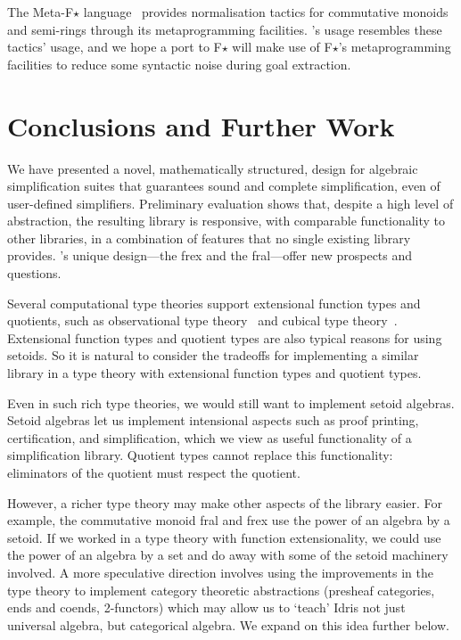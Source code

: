 The Meta-F$\star$ language~\cite{martinez-et-al:metafstar} provides
normalisation tactics for commutative monoids and semi-rings through
its metaprogramming facilities. \Frexlib{}'s usage resembles
these tactics' usage, and we hope a
\Frexlib{} port to F$\star$ will make use of F$\star$'s metaprogramming
facilities to reduce some syntactic noise during goal extraction.

\section{Conclusions and Further Work}

We have presented a novel, mathematically structured, design for
algebraic simplification suites that guarantees sound and complete
simplification, even of user-defined simplifiers. Preliminary
evaluation shows that, despite a high level of abstraction, the
resulting library is responsive, with comparable functionality
to other libraries, in a combination of features that no single existing
library provides. \Frexlib{}'s unique design---the frex and
the fral---offer new prospects and questions.

Several computational type theories
support extensional function types and quotients, such as
observational type theory~\cite{altenkirch-et-al:ott-now,pujet-tabareau:ott-now-for-good,pujet-tabareau:impredicative-ott,pujet-leray-tabareau:ott-meets-cic} and cubical type theory~\cite{vezzosi-et-al:cubical-agda,cohen-et-al:cubical-tt}.
Extensional function types and quotient types are also typical reasons
for using setoids.  So it is natural to consider the tradeoffs for
implementing a similar library in a type theory with extensional
function types and quotient types.

Even in such rich type theories, we would still want to implement
setoid algebras.  Setoid algebras let us implement intensional aspects
such as proof printing, certification, and simplification, which we
view as useful functionality of a simplification library. Quotient
types cannot replace this functionality: eliminators of the quotient
must respect the quotient.

However, a richer type theory may make other aspects of the library
easier. For example, the commutative monoid fral and frex use the
power of an algebra by a setoid. If we worked in a type theory with
function extensionality, we could use the power of an algebra by a set
and do away with some of the setoid machinery involved.  A more
speculative direction involves using the improvements in the type
theory to implement category theoretic abstractions (presheaf
categories, ends and coends, 2-functors) which may allow us to `teach'
Idris not just universal algebra, but categorical algebra. We expand
on this idea further below.

